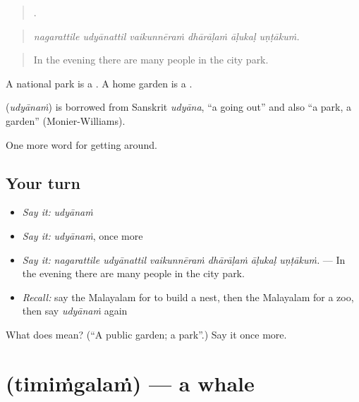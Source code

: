 \begin{quote}
     .
\end{quote}

\begin{quote}
\emph{nagarattile udyānattil vaikunnēraṁ dhārāḷaṁ āḷukaḷ uṇṭākuṁ.}
\end{quote}

\begin{quote}
In the evening there are many people in the city park.
\end{quote}

A national park is a . A home garden is a .

\begin{cousinweb}
\textbf{} (\emph{udyānaṁ}) is borrowed from Sanskrit \emph{udyāna}, \textquotedblleft{}a going out\textquotedblright{} and also \textquotedblleft{}a park, a garden\textquotedblright{} (Monier-Williams).
\end{cousinweb}

\begin{grammarlens}[title={What you've built}]
One more word for getting around.
\end{grammarlens}

\subsection*{Your turn}
\begin{itemize}
\raggedright
  \item \emph{Say it:} \emph{udyānaṁ}
  \item \emph{Say it:} \emph{udyānaṁ}, once more
  \item \emph{Say it:} \emph{nagarattile udyānattil vaikunnēraṁ dhārāḷaṁ āḷukaḷ uṇṭākuṁ.} — In the evening there are many people in the city park.
  \item \emph{Recall:} say the Malayalam for to build a nest, then the Malayalam for a zoo, then say \emph{udyānaṁ} again
\end{itemize}

\begin{tcolorbox}[breakable,colback=teal!4,colframe=teal!35!black,title={Before you move on}]
What does  mean? (\textquotedblleft{}A public garden; a park\textquotedblright{}.) Say it once more.
\end{tcolorbox}
\section[\texorpdfstring{\ml{തിമിംഗലം} (timiṁgalaṁ)}{തിമിംഗലം (timiṁgalaṁ)}]{ (timiṁgalaṁ) — a whale}

